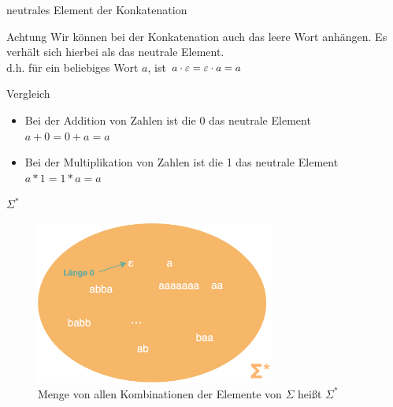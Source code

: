 \begin{frame}{neutrales Element der Konkatenation}
    \begin{alertblock}{Achtung}
        Wir können bei der Konkatenation auch das leere Wort anhängen. Es verhält sich hierbei als das neutrale Element.\\
        d.h. für ein beliebiges Wort $a$, ist $a\cdot\varepsilon = \varepsilon\cdot a=a$
        \begin{exampleblock}{Vergleich}
        \begin{itemize}
            \item Bei der Addition von Zahlen ist die 0 das neutrale Element\\
            $a+0=0+a=a$
            \item Bei der Multiplikation von Zahlen ist die 1 das neutrale Element\\
            $a*1=1*a=a$
        \end{itemize}
        
        \end{exampleblock}
    \end{alertblock}
\end{frame}


\begin{frame}[fragile]{$\Sigma^\ast$}
\begin{figure}
    \centering
    \includegraphics[width=0.7\textwidth]{figures/SigmaSternEpsilon.png}
    \caption{Menge von allen Kombinationen der Elemente von $\Sigma$ heißt $\Sigma^\ast$}
\end{figure}
\end{frame}

